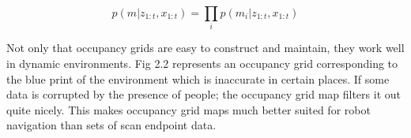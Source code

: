 

\begin{equation}
    p(m|z_{1:t},x_{1:t}) = \prod_i{p(m_i|z_{1:t},x_{1:t})}
\end{equation}

Not only that occupancy grids are easy to construct and maintain, they work well in dynamic environments. Fig 2.2 represents an occupancy grid corresponding to the blue print of the environment which is inaccurate in certain places\cite{25}. If some data is corrupted by the presence of people; the occupancy grid map filters it out quite nicely. This makes occupancy grid maps much better suited for robot navigation than sets of scan endpoint data.

